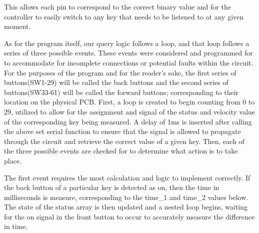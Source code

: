 This allows each pin to correspond to the correct binary value and for the controller to
easily switch to any key that needs to be listened to at any given moment.

As for the program itself, our query logic follows a loop, and that loop follows a series
of three possible events. These events were considered and programmed for to accommodate
for incomplete connections or potential faults within the circuit. For the purposes of the
program and for the reader’s sake, the first series of buttons(SW1-29) will be called the
back buttons and the second series of buttons(SW33-61) will be called the forward buttons;
corresponding to their location on the physical PCB. First, a loop is created to begin
counting from 0 to 29, utilized to allow for the assignment and signal of the status and
velocity value of the corresponding key being measured. A delay of 1ms is inserted after
calling the above set serial function to ensure that the signal is allowed to propagate
through the circuit and retrieve the correct value of a given key. Then, each of the three
possible events are checked for to determine what action is to take place.

The first event requires the most calculation and logic to implement correctly. If the
back button of a particular key is detected as on, then the time in milliseconds is
measure, corresponding to the time\_1 and time\_2 values below. The state of the status
array is then updated and a nested loop begins, waiting for the on signal in the front
button to occur to accurately measure the difference in time.

